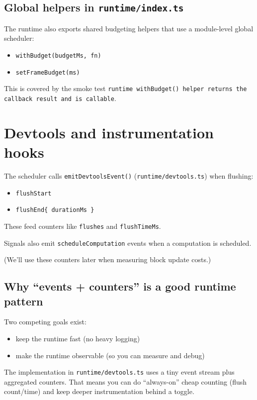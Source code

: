 \subsection{Global helpers in \texttt{runtime/index.ts}}

The runtime also exports shared budgeting helpers that use a module-level global scheduler:

\begin{itemize}
  \item \texttt{withBudget(budgetMs, fn)}
  \item \texttt{setFrameBudget(ms)}
\end{itemize}

This is covered by the smoke test \texttt{runtime withBudget() helper returns the callback result and is callable}.

\section{Devtools and instrumentation hooks}

The scheduler calls \texttt{emitDevtoolsEvent()} (\texttt{runtime/devtools.ts}) when flushing:

\begin{itemize}
  \item \texttt{flushStart}
  \item \texttt{flushEnd\{ durationMs \}}
\end{itemize}

These feed counters like \texttt{flushes} and \texttt{flushTimeMs}.

Signals also emit \texttt{scheduleComputation} events when a computation is scheduled.

(We’ll use these counters later when measuring block update costs.)

\subsection{Why ``events + counters'' is a good runtime pattern}

Two competing goals exist:

\begin{itemize}
  \item keep the runtime fast (no heavy logging)
  \item make the runtime observable (so you can measure and debug)
\end{itemize}

The implementation in \texttt{runtime/devtools.ts} uses a tiny event stream plus aggregated counters.
That means you can do ``always-on'' cheap counting (flush count/time) and keep deeper instrumentation behind a toggle.

